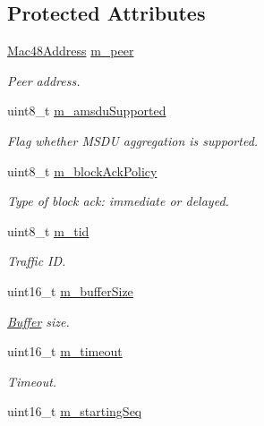 \subsection*{Protected Attributes}
\begin{DoxyCompactItemize}
\item 
\hyperlink{classns3_1_1Mac48Address}{Mac48\+Address} \hyperlink{classns3_1_1BlockAckAgreement_a132df940ae22c624bf2a44e3a2cc8874}{m\+\_\+peer}
\begin{DoxyCompactList}\small\item\em Peer address. \end{DoxyCompactList}\item 
uint8\+\_\+t \hyperlink{classns3_1_1BlockAckAgreement_ac344be8377041fb6d85c93fb24f5ca0a}{m\+\_\+amsdu\+Supported}
\begin{DoxyCompactList}\small\item\em Flag whether M\+S\+DU aggregation is supported. \end{DoxyCompactList}\item 
uint8\+\_\+t \hyperlink{classns3_1_1BlockAckAgreement_a7da1f279216c42ae0cf8bc1b68f7d614}{m\+\_\+block\+Ack\+Policy}
\begin{DoxyCompactList}\small\item\em Type of block ack\+: immediate or delayed. \end{DoxyCompactList}\item 
uint8\+\_\+t \hyperlink{classns3_1_1BlockAckAgreement_a8c3e7cdd82445f207e41714e1d5d1299}{m\+\_\+tid}
\begin{DoxyCompactList}\small\item\em Traffic ID. \end{DoxyCompactList}\item 
uint16\+\_\+t \hyperlink{classns3_1_1BlockAckAgreement_aa26b08618a027c94e08e2705d864e97c}{m\+\_\+buffer\+Size}
\begin{DoxyCompactList}\small\item\em \hyperlink{classns3_1_1Buffer}{Buffer} size. \end{DoxyCompactList}\item 
uint16\+\_\+t \hyperlink{classns3_1_1BlockAckAgreement_a7b383c3c3362763e0748d65cb3c5f4da}{m\+\_\+timeout}
\begin{DoxyCompactList}\small\item\em Timeout. \end{DoxyCompactList}\item 
uint16\+\_\+t \hyperlink{classns3_1_1BlockAckAgreement_a8e4caf227b3cbf4cc1a43be50bac37ae}{m\+\_\+starting\+Seq}

\end{DoxyCompactItemize}
